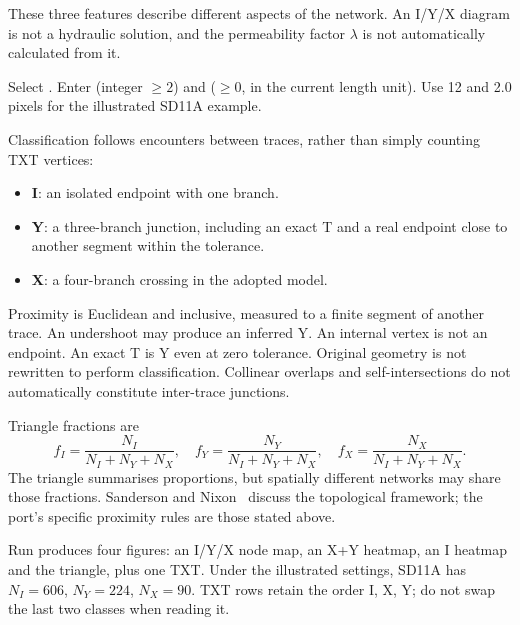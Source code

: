 \label{sec:flow}
These three features describe different aspects of the network. An I/Y/X diagram is not a hydraulic solution, and the permeability factor \(\lambda\) is not automatically calculated from it.

Select . Enter  (integer \(\geq2\)) and  (\(\geq0\), in the current length unit). Use 12 and 2.0 pixels for the illustrated SD11A example.

Classification follows encounters between traces, rather than simply counting TXT vertices:
\begin{itemize}
\item \textbf{I}: an isolated endpoint with one branch.
\item \textbf{Y}: a three-branch junction, including an exact T and a real endpoint close to another segment within the tolerance.
\item \textbf{X}: a four-branch crossing in the adopted model.
\end{itemize}
Proximity is Euclidean and inclusive, measured to a finite segment of another trace. An undershoot may produce an inferred Y. An internal vertex is not an endpoint. An exact T is Y even at zero tolerance. Original geometry is not rewritten to perform classification. Collinear overlaps and self-intersections do not automatically constitute inter-trace junctions.

Triangle fractions are
\begin{equation}f_I=\frac{N_I}{N_I+N_Y+N_X},\quad f_Y=\frac{N_Y}{N_I+N_Y+N_X},\quad f_X=\frac{N_X}{N_I+N_Y+N_X}.
\end{equation}
The triangle summarises proportions, but spatially different networks may share those fractions. Sanderson and Nixon~\cite{sanderson} discuss the topological framework; the port's specific proximity rules are those stated above.

Run produces four figures: an I/Y/X node map, an X+Y heatmap, an I heatmap and the triangle, plus one TXT. Under the illustrated settings, SD11A has \(N_I=606\), \(N_Y=224\), \(N_X=90\). TXT rows retain the order I, X, Y; do not swap the last two classes when reading it.

